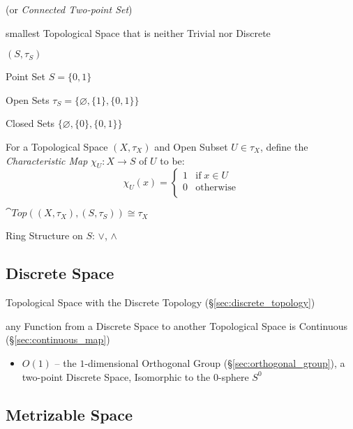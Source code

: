 (or \emph{Connected Two-point Set})

smallest Topological Space that is neither Trivial nor Discrete

$(S,\tau_S)$

Point Set $S = \{0,1\}$

Open Sets $\tau_S = \{\varnothing, \{1\}, \{0,1\}\}$

Closed Sets $\{\varnothing, \{0\}, \{0,1\}\}$

For a Topological Space $(X,\tau_X)$ and Open Subset $U \in \tau_X$,
define the \emph{Characteristic Map} $\chi_U : X \rightarrow S$ of $U$ to be:
\[
  \chi_U (x) =
  \begin{cases}
    1  & \text{if}\; x \in U \\
    0  & \text{otherwise} \\
  \end{cases}
\]

$\cat{Top}((X,\tau_X),(S,\tau_S)) \cong \tau_X$

Ring Structure on $S$: $\vee$, $\wedge$



\subsection{Discrete Space}\label{sec:discrete_space}

Topological Space with the Discrete Topology (\S\ref{sec:discrete_topology})

any Function from a Discrete Space to another Topological Space is Continuous
(\S\ref{sec:continuous_map})

\begin{itemize}
  \item $O(1)$ -- the $1$-dimensional Orthogonal Group
    (\S\ref{sec:orthogonal_group}), a two-point Discrete Space, Isomorphic to
    the $0$-sphere $S^0$
\end{itemize}



\subsection{Metrizable Space}\label{sec:metrizable_space}

